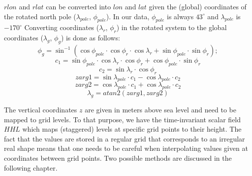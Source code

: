 $rlon$ and $rlat$ can be converted into $lon$ and $lat$ given the (global) coordinates of the rotated north pole ($\lambda_{pole}$, $\phi_{pole}$). In our data, $\phi_{pole}$ is always $43^{\circ}$ and $\lambda_{pole}$ is $-170^{\circ}$ Converting coordinates ($\lambda_r$, $\phi_r$) in the rotated system to the global coordinates ($\lambda_g$, $\phi_g$) is done as follows: 
\begin{equation}
		\phi_g = \sin^{-1} ( \cos \phi_{pole} \cdot \cos \phi_r \cdot \cos \lambda_r + \sin \phi_{pole} \cdot \sin \phi_r );
\end{equation}
\begin{equation}
		c_1 = \sin \phi_{pole} \cdot \cos \lambda_r \cdot \cos \phi_r + \cos \phi_{pole} \cdot \sin \phi_r
\end{equation}
\begin{equation}
		c_2 = \sin \lambda_r \cdot \cos \phi_r
\end{equation}
\begin{equation}
		zarg1 = \sin \lambda_{pole} \cdot c_1 - \cos \lambda_{pole} \cdot c_2
\end{equation}
\begin{equation}
		zarg2 = \cos \lambda_{pole} \cdot c_1 + \cos \lambda_{pole} \cdot c_2
\end{equation}
\begin{equation}
		\lambda_g = atan2(zarg1,zarg2)
\end{equation}

The vertical coordinates $z$ are given in meters above sea level and need to be mapped to grid levels. To that purpose, we have the time-invariant scalar field $HHL$ which maps (staggered) levels at specific grid points to their height.
The fact that the values are stored in a regular grid that corresponds to an irregular real shape means that one needs to be careful when interpolating values given at coordinates between grid points. Two possible methods are discussed in the following chapter.



